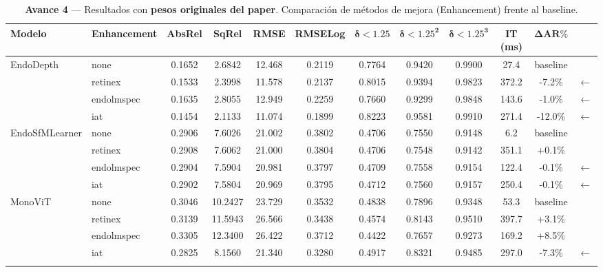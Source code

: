 \documentclass{article}
\begin{document}
\begin{table}[htbp]
\centering
\small
\setlength{\tabcolsep}{5pt}
\renewcommand{\arraystretch}{1.15}

\caption{\textbf{Avance 4} — Resultados con \textbf{pesos originales del paper}. Comparación de métodos de mejora (Enhancement) frente al baseline.}
\label{tab:avance4}

\begin{tabular}{llccccccccc@{\hspace{12pt}}l}
\toprule
\textbf{Modelo} & \textbf{Enhancement} & \textbf{AbsRel} & \textbf{SqRel} & \textbf{RMSE} & \textbf{RMSELog} & $\mathbf{\delta < 1.25}$ & $\mathbf{\delta < 1.25^2}$ & $\mathbf{\delta < 1.25^3}$ & \textbf{IT (ms)} & \textbf{$\mathbf{\Delta\text{AR}\%}$} & \\
\midrule

EndoDepth & none       & 0.1652 &  2.6842 & 12.468 & 0.2119 & 0.7764 & 0.9420 & 0.9900 &  27.4 & baseline & \\
          & retinex    & 0.1533 &  2.3998 & 11.578 & 0.2137 & 0.8015 & 0.9394 & 0.9823 & 372.2 &  -7.2\%  & $\leftarrow$ \\
          & endolmspec & 0.1635 &  2.8055 & 12.949 & 0.2259 & 0.7660 & 0.9299 & 0.9848 & 143.6 &  -1.0\%  & $\leftarrow$ \\
          & iat        & 0.1454 &  2.1133 & 11.074 & 0.1899 & 0.8223 & 0.9581 & 0.9910 & 271.4 & -12.0\%  & $\leftarrow$ \\
\addlinespace[0.8em]

EndoSfMLearner & none       & 0.2906 & 7.6026 & 21.002 & 0.3802 & 0.4706 & 0.7550 & 0.9148 &   6.2 & baseline & \\
               & retinex    & 0.2908 & 7.6062 & 21.000 & 0.3804 & 0.4706 & 0.7548 & 0.9142 & 351.1 &  +0.1\%  & \\
               & endolmspec & 0.2904 & 7.5904 & 20.981 & 0.3797 & 0.4709 & 0.7558 & 0.9154 & 122.4 &  -0.1\%  & $\leftarrow$ \\
               & iat        & 0.2902 & 7.5804 & 20.969 & 0.3795 & 0.4712 & 0.7560 & 0.9157 & 250.4 &  -0.1\%  & $\leftarrow$ \\
\addlinespace[0.8em]

MonoViT & none       & 0.3046 & 10.2427 & 23.729 & 0.3532 & 0.4838 & 0.7896 & 0.9348 &  53.3 & baseline & \\
        & retinex    & 0.3139 & 11.5943 & 26.566 & 0.3438 & 0.4574 & 0.8143 & 0.9510 & 397.7 &  +3.1\%  & \\
        & endolmspec & 0.3305 & 12.3400 & 26.422 & 0.3712 & 0.4422 & 0.7657 & 0.9273 & 169.2 &  +8.5\%  & \\
        & iat        & 0.2825 &  8.1560 & 21.340 & 0.3280 & 0.4917 & 0.8321 & 0.9485 & 297.0 &  -7.3\%  & $\leftarrow$ \\
\addlinespace[0.8em]


\end{tabular}
\end{table}
\end{document}
